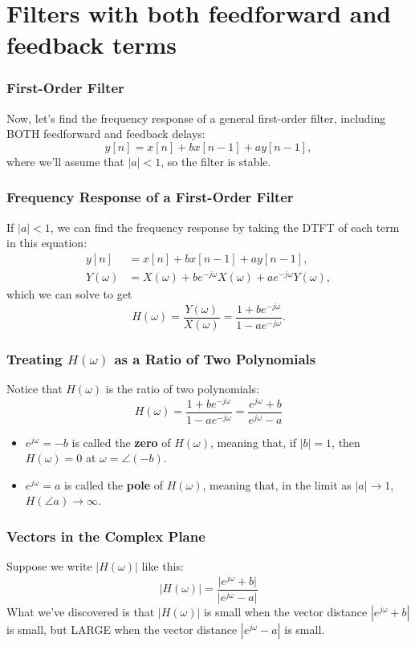 \documentclass{beamer}
\begin{document}
\section[Feedforward and Feedback]{Filters with both feedforward and feedback terms}
\setcounter{subsection}{1}

\begin{frame}
  \frametitle{First-Order Filter}

  Now, let's find the frequency response of a general first-order filter, including BOTH
  feedforward and feedback delays:
  \[
  y[n] = x[n] + bx[n-1] + ay[n-1],
  \]
  where we'll assume that $|a|<1$, so the filter is stable.  
\end{frame}

\begin{frame}
  \frametitle{Frequency Response of a First-Order Filter}

  If $|a|<1$, we can find the frequency response by taking the DTFT of each
  term in this equation:
  \begin{align*}
    y[n] &= x[n] + bx[n-1] + ay[n-1],\\
    Y(\omega) &= X(\omega)+be^{-j\omega}X(\omega)+ae^{-j\omega} Y(\omega),
  \end{align*}
  which we can solve to get
  \[
  H(\omega)  = \frac{Y(\omega)}{X(\omega)} = \frac{1+be^{-j\omega}}{1-ae^{-j\omega}}.
  \]
\end{frame}

\begin{frame}
  \frametitle{Treating $H(\omega)$ as a Ratio of Two Polynomials}

  Notice that $H(\omega)$ is the ratio of two polynomials:
  \[
  H(\omega)=\frac{1+be^{-j\omega}}{1-ae^{-j\omega}}=\frac{e^{j\omega}+b}{e^{j\omega}-a}
  \]
  \begin{itemize}
  \item $e^{j\omega}=-b$ is called the {\bf zero} of $H(\omega)$, meaning that, if
    $|b|=1$, then $H(\omega)=0$ at $\omega=\angle (-b)$.
  \item $e^{j\omega}=a$ is called the {\bf pole} of $H(\omega)$,
    meaning that, in the limit as $|a|\rightarrow 1$, $H(\angle
    a)\rightarrow\infty$.
  \end{itemize}
\end{frame}

\begin{frame}
  \frametitle{Vectors in the Complex Plane}

  Suppose we write $|H(\omega)|$ like this:
  \[
  \vert H(\omega)\vert = \frac{\vert e^{j\omega}+b\vert}{\vert e^{j\omega}-a\vert}
  \]
  What we've discovered is that $|H(\omega)|$ is small when the vector
  distance $|e^{j\omega}+b|$ is small, but LARGE when the vector
  distance $|e^{j\omega}-a|$ is small.
\end{frame}
\end{document}
